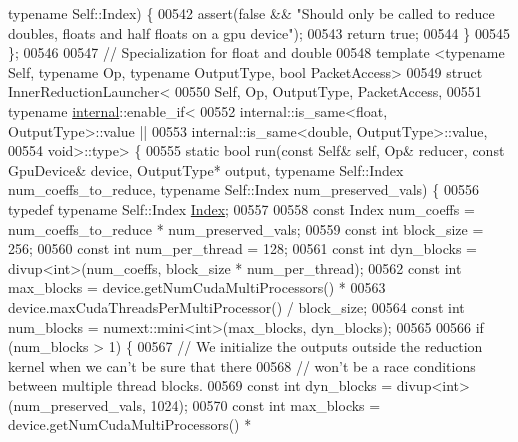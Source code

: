 \begin{DoxyCode}
{      typename} Self::Index) \{
00542     assert(\textcolor{keyword}{false} && \textcolor{stringliteral}{"Should only be called to reduce doubles, floats and half floats on a gpu device"});
00543     \textcolor{keywordflow}{return} \textcolor{keyword}{true};
00544   \}
00545 \};
00546 
00547 \textcolor{comment}{// Specialization for float and double}
00548 \textcolor{keyword}{template} <\textcolor{keyword}{typename} Self, \textcolor{keyword}{typename} Op, \textcolor{keyword}{typename} OutputType, \textcolor{keywordtype}{bool} PacketAccess>
00549 \textcolor{keyword}{struct }InnerReductionLauncher<
00550   Self, Op, OutputType, PacketAccess,
00551   typename \hyperlink{namespaceinternal}{internal}::enable\_if<
00552     internal::is\_same<float, OutputType>::value ||
00553     internal::is\_same<double, OutputType>::value,
00554   void>::type> \{
00555   \textcolor{keyword}{static} \textcolor{keywordtype}{bool} run(\textcolor{keyword}{const} Self& \textcolor{keyword}{self}, Op& reducer, \textcolor{keyword}{const} GpuDevice& device, OutputType* output, \textcolor{keyword}{typename} 
      Self::Index num\_coeffs\_to\_reduce, \textcolor{keyword}{typename} Self::Index num\_preserved\_vals) \{
00556     \textcolor{keyword}{typedef} \textcolor{keyword}{typename} Self::Index \hyperlink{namespace_eigen_a62e77e0933482dafde8fe197d9a2cfde}{Index};
00557 
00558     \textcolor{keyword}{const} Index num\_coeffs = num\_coeffs\_to\_reduce * num\_preserved\_vals;
00559     \textcolor{keyword}{const} \textcolor{keywordtype}{int} block\_size = 256;
00560     \textcolor{keyword}{const} \textcolor{keywordtype}{int} num\_per\_thread = 128;
00561     \textcolor{keyword}{const} \textcolor{keywordtype}{int} dyn\_blocks = divup<int>(num\_coeffs, block\_size * num\_per\_thread);
00562     \textcolor{keyword}{const} \textcolor{keywordtype}{int} max\_blocks = device.getNumCudaMultiProcessors() *
00563                            device.maxCudaThreadsPerMultiProcessor() / block\_size;
00564     \textcolor{keyword}{const} \textcolor{keywordtype}{int} num\_blocks = numext::mini<int>(max\_blocks, dyn\_blocks);
00565 
00566     \textcolor{keywordflow}{if} (num\_blocks > 1) \{
00567       \textcolor{comment}{// We initialize the outputs outside the reduction kernel when we can't be sure that there}
00568       \textcolor{comment}{// won't be a race conditions between multiple thread blocks.}
00569       \textcolor{keyword}{const} \textcolor{keywordtype}{int} dyn\_blocks = divup<int>(num\_preserved\_vals, 1024);
00570       \textcolor{keyword}{const} \textcolor{keywordtype}{int} max\_blocks = device.getNumCudaMultiProcessors() *

\end{DoxyCode}
